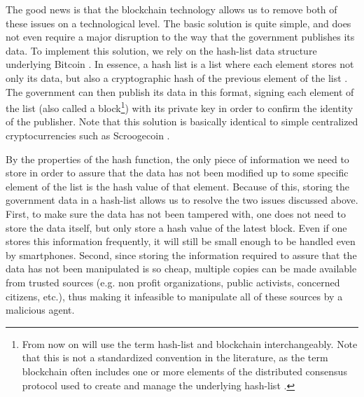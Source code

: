 The good news is that the blockchain technology allows us to remove both of these issues on a technological level. The basic solution is quite simple, and does not even require a major disruption to the way that the government publishes its data. To implement this solution, we rely on the hash-list data structure underlying Bitcoin \cite{whitepaper,bitcoinbook}. In essence, a hash list is a list where each element stores not only its data, but also a cryptographic hash of the previous element of the list \cite{bitcoinbook}. The government can then publish its data in this format, signing each element of the list (also called a block\footnote{From now on will use the term hash-list and blockchain interchangeably. Note that this is not a standardized convention in the literature, as the term blockchain often includes one or more elements of the distributed consensus protocol used to create and manage the underlying hash-list \cite{NarayananC17}.}) with its private key in order to confirm the identity of the publisher. Note that this solution is basically identical to simple centralized cryptocurrencies such as Scroogecoin \cite{bitcoinbook}.

By the properties of the hash function, the only piece of information we need to store in order to assure that the data has not been modified up to some specific element of the list is the hash value of that element. Because of this, storing the government data in a hash-list allows us to resolve the two issues discussed above. First, to make sure the data has not been tampered with, one does not need to store the data itself, but only store a hash value of the latest block. Even if one stores this information frequently, it will still be small enough to be handled even by smartphones. Second, since storing the information required to assure that the data has not been manipulated is so cheap, multiple copies can be made available from trusted sources (e.g. non profit organizations, public activists, concerned citizens, etc.), thus making it infeasible to manipulate all of these sources by a malicious agent.






